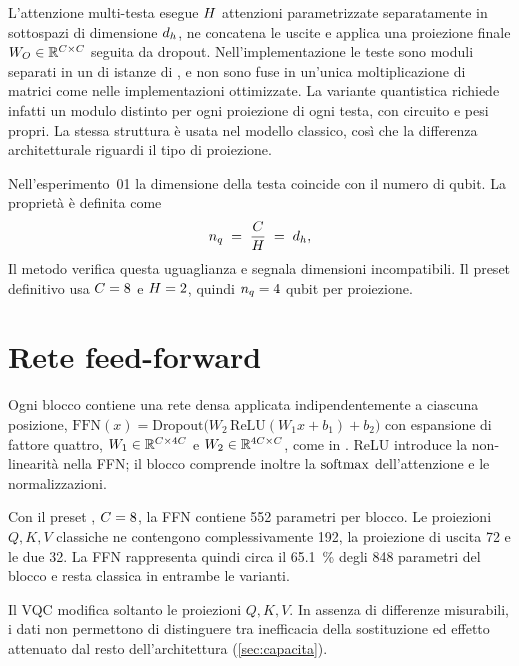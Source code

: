 L'attenzione multi-testa esegue $H$ attenzioni parametrizzate separatamente
in sottospazi di dimensione $d_h$, ne concatena le uscite e applica una
proiezione finale $W_O \in \mathbb{R}^{C \times C}$ seguita da dropout.
Nell'implementazione le
teste sono moduli separati in un  di istanze di ,
e non sono fuse in un'unica moltiplicazione di matrici come nelle implementazioni
ottimizzate. La variante quantistica richiede infatti un modulo distinto per ogni
proiezione di ogni testa, con circuito e pesi propri. La stessa struttura è usata
nel modello classico, così che la differenza architetturale riguardi il tipo di
proiezione.

Nell'esperimento~01 la dimensione della testa coincide con il numero di qubit. La
proprietà  è definita come
\begin{equation}
  n_q \;=\; \frac{C}{H} \;=\; d_h ,
  \label{eq:nqubits-gpt}
\end{equation}
Il metodo  verifica questa uguaglianza e segnala
dimensioni incompatibili. Il preset definitivo  usa $C=8$ e
$H=2$, quindi $n_q=4$ qubit per proiezione.

\section{Rete feed-forward}
\label{sec:ffn}

Ogni blocco contiene una rete densa applicata indipendentemente a ciascuna
posizione, $\text{FFN}(x) = \text{Dropout}\big(W_2\,\mathrm{ReLU}(W_1 x + b_1) +
b_2\big)$ con espansione di fattore quattro, $W_1 \in \mathbb{R}^{C \times 4C}$ e
$W_2 \in \mathbb{R}^{4C \times C}$, come in \textcite{vaswani2017attention}.
ReLU introduce la non-linearità nella FFN; il blocco comprende inoltre la
$\operatorname{softmax}$ dell'attenzione e le normalizzazioni.

Con il preset , $C=8$, la FFN contiene \num{552} parametri per
blocco. Le proiezioni $Q,K,V$ classiche ne contengono complessivamente \num{192},
la proiezione di uscita 72 e le due  32. La FFN rappresenta
quindi circa il \SI{65,1}{\percent} degli 848 parametri del blocco e resta
classica in entrambe le varianti.

Il VQC modifica soltanto le proiezioni $Q,K,V$. In assenza di differenze
misurabili, i dati non permettono di distinguere tra inefficacia della
sostituzione ed effetto attenuato dal resto dell'architettura
(\cref{sec:capacita}).

